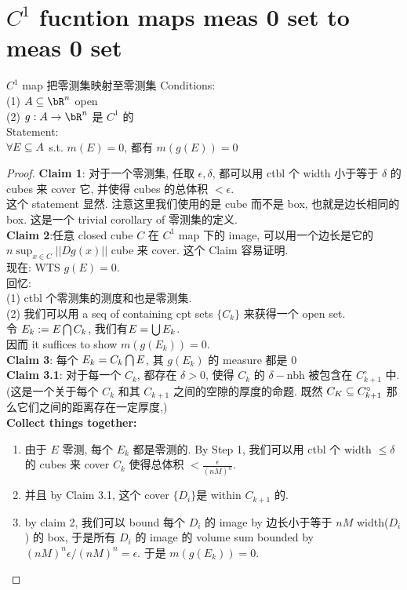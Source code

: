 \documentclass[lang=cn,11pt]{elegantbook}
\begin{document}
\section{$C^1$ fucntion maps meas 0 set to meas 0 set}
\begin{theorem}{$C^1$ map 把零测集映射至零测集}
Conditions:\\
(1) $A \sub \bR^n$ open\\
(2) $g: A \rar \bR^n$ 是 $C^1$ 的\\
Statement:\\
$\forall E\subseteq A $ s.t. $m(E)= 0$, 都有 $m(g(E)) = 0$ 
\end{theorem}
\begin{proof}
\textbf{Claim 1}: 对于一个零测集, 任取 $\epsilon, \delta$, 都可以用 ctbl 个 width 小于等于 $\delta$ 的 cubes 来 cover 它, 并使得 cubes 的总体积 $< \epsilon$.\\
这个 statement 显然. 注意这里我们使用的是 cube 而不是 box, 也就是边长相同的 box. 这是一个 trivial corollary of 零测集的定义.\\
\textbf{Claim 2}:任意 closed cube $C$ 在 $C^1$ map 下的 image, 可以用一个边长是它的 $n\sup_{x \in C} ||Dg(x)||$ cube 来 cover. 这个 Claim 容易证明.\\
现在: WTS $g(E) = 0$.\\
回忆:\\
(1) ctbl 个零测集的测度和也是零测集.\\
(2) 我们可以用 a seq of containing cpt sets $\{C_k \}$ 来获得一个 open set.\\
令 $E_k := E \bigcap C_k$, 我们有$E = \bigcup E_k$.\\
因而 it suffices to show $m(g(E_k)) = 0$.\\
\textbf{Claim 3}: 每个 $E_k = C_k \bigcap E$, 其 $g(E_k)$ 的 measure 都是 0\\
\textbf{Claim 3.1}: 对于每一个 $C_k$, 都存在 $\delta > 0$, 使得 $C_k$ 的 $\delta-$nbh 被包含在 $C_{k+1} ^ {\circ}$ 中. (这是一个关于每个 $C_k$ 和其 $C_{k+1}$ 之间的空隙的厚度的命题. 既然 $C_K \subseteq C_{k+1} ^ {\circ}$ 那么它们之间的距离存在一定厚度,)\\
\textbf{Collect things together:}
\begin{enumerate}
    \item 由于 $E$ 零测, 每个 $E_k$ 都是零测的. By Step 1, 我们可以用 ctbl 个 width $\leq \delta$ 的 cubes 来 cover $C_k$ 使得总体积 $< \frac{\epsilon}{(nM)^n}$. 
    \item 并且 by Claim 3.1, 这个 cover $\{D_i\}$是 within $C_{k+1} $ 的. 
    \item by claim 2, 我们可以 bound 每个 $D_i$ 的 image by 边长小于等于 $nM$ width($D_i$) 的 box, 于是所有 $D_i$ 的 image 的 volume sum bounded by $(nM)^n \epsilon /(nM)^n = \epsilon$. 于是 $m(g(E_k)) = 0$.
\end{enumerate}
\end{proof}
\end{document}
